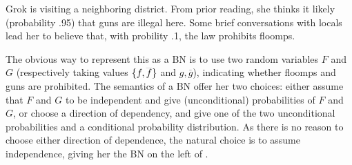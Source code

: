 \documentclass[letterpaper]{article} %
\newif\ifprecompiledfigs
\theoremstyle{plain}
\theoremstyle{definition}
\theoremstyle{remark}
\begin{document}
\begin{example} \label{ex:guns-and-floomps}
Grok is visiting a neighboring district. From prior reading, she thinks it
likely (probability .95) that guns are illegal here. Some brief conversations
with locals lead her to believe that, with probility .1, the law
prohibits floomps.

The obvious way to represent this as a BN is to use two random variables
$F$ and $G$ (respectively taking values $\{f, \smash{\overline f}\}$ and $g,
\overline g$),
indicating whether  floomps and guns are prohibited.
The semantics of a BN offer her two choices: either assume that $F$ and $G$
to be independent and give (unconditional) probabilities of $F$ and $G$, or
choose a direction of dependency, and give one of the two unconditional
probabilities and a conditional probability distribution. 
As there is no reason to choose either direction of dependence, the
natural choice is to 
assume independence, giving her the 
BN on the left of .

\begin{figure}[htb]
  \centering
\ifprecompiledfigs
~\vrule~
\else
\end{figure}
\end{example}
\end{document}
